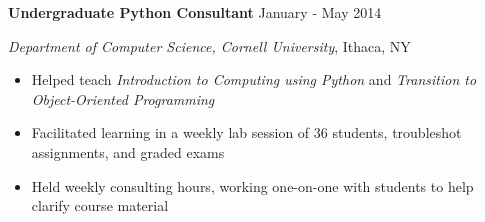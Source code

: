 
\vspace{5pt}

\textbf{Undergraduate Python Consultant} \hfill January - May 2014

\textit{Department of Computer Science, Cornell University}, Ithaca, NY

\begin{itemize}
    \item Helped teach \textit{Introduction to Computing using Python} and \textit{Transition to Object-Oriented Programming}
    \item Facilitated learning in a weekly lab session of 36 students, troubleshot assignments, and graded exams
    \item Held weekly consulting hours, working one-on-one with students to help clarify course material
\end{itemize}
